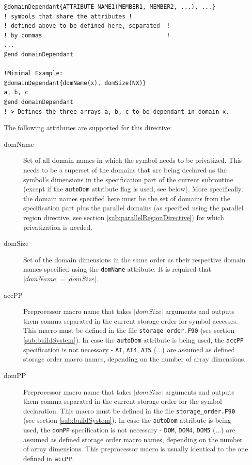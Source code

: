 \begin{lstlisting}[name=domainDependant, label=listing:domainDependant, caption={Domain dependant directive syntax.}]
@domainDependant{ATTRIBUTE_NAME1(MEMBER1, MEMBER2, ...), ...}
! symbols that share the attributes !
! defined above to be defined here, separated  !
! by commas                                    !
...
@end domainDependant

!Minimal Example:
@domainDependant{domName(x), domSize(NX)}
a, b, c
@end domainDependant
!-> Defines the three arrays a, b, c to be dependant in domain x.
\end{lstlisting}

The following attributes are supported for this directive:

\begin{description}
  \item [domName] Set of all domain names in which the symbol needs to be privatized. This needs to be a superset of the domains that are being declared as the symbol's dimensions in the specification part of the current subroutine (except if the \verb|autoDom| attribute flag is used, see below). More specifically, the domain names specified here must be the set of domains from the specification part plus the parallel domains (as specified using the parallel region directive, see section \ref{sub:parallelRegionDirective}) for which privatization is needed.
 \item [domSize] Set of the domain dimensions in the same order as their respective domain names specified using the \verb|domName| attribute. It is required that $|domName| = |domSize|$.
 \item [accPP \label{descr:accPP}] Preprocessor macro name that takes $|domSize|$ arguments and outputs them comma separated in the current storage order for symbol accesses. This macro must be defined in the file \verb|storage_order.F90| (see section \ref{sub:buildSystem}). In case the \verb|autoDom| attribute is being used, the \verb|accPP| specification is not necessary - \verb|AT|, \verb|AT4|, \verb|AT5| (...) are assumed as defined storage order macro names, depending on the number of array dimensions.
 \item [domPP \label{descr:domPP} ] Preprocessor macro name that takes $|domSize|$ arguments and outputs them comma separated in the current storage order for the symbol declaration. This macro must be defined in the file \verb|storage_order.F90| (see section \ref{sub:buildSystem}). In case the \verb|autoDom| attribute is being used, the \verb|domPP| specification is not necessary - \verb|DOM|, \verb|DOM4|, \verb|DOM5| (...) are assumed as defined storage order macro names, depending on the number of array dimensions. This preprocessor macro is usually identical to the one defined in \verb|accPP|.

\end{description}
